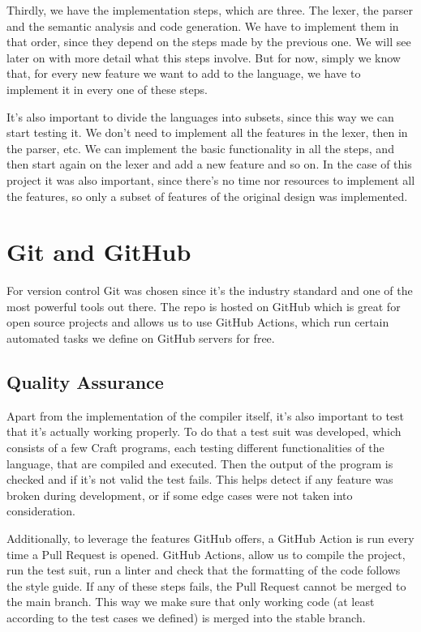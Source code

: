 ﻿\documentclass[10pt,a4paper,twocolumn,twoside]{article}
\begin{document}
Thirdly, we have the implementation steps, which are three. The lexer, the
parser and the semantic analysis and code generation. We have to implement them
in that order, since they depend on the steps made by the previous one.  We will
see later on with more detail what this steps involve. But for now, simply we
know that, for every new feature we want to add to the language, we have to
implement it in every one of these steps.

It's also important to divide the languages into subsets, since this way we 
can start testing it. We don't need to implement all the features in the lexer,
then in the parser, etc. We can implement the basic functionality in all the 
steps, and then start again on the lexer and add a new feature and so on. In the
case of this project it was also important, since there's no time nor resources
to implement all the features, so only a subset of features of the original 
design was implemented.

\section{Git and GitHub}
For version control Git was chosen since it's the industry standard and one of
the most powerful tools out there. The repo is hosted on GitHub which is great
for open source projects and allows us to use GitHub Actions, which run certain
automated tasks we define on GitHub servers for free.

\subsection{Quality Assurance}
Apart from the implementation of the compiler itself, it's also important to 
test that it's actually working properly. To do that a test suit was developed,
which consists of a few Craft programs, each testing different functionalities 
of the language, that are compiled and executed. Then the output of the program 
is checked and if it's not valid the test fails. This helps detect if any 
feature was broken during development, or if some edge cases were not taken into
consideration.

Additionally, to leverage the features GitHub offers, a GitHub Action is run 
every time a Pull Request is opened. GitHub Actions, allow us to compile the 
project, run the test suit, run a linter and check that the formatting of the 
code follows the style guide. If any of these steps fails, the Pull Request
cannot be merged to the main branch. This way we make sure that only working 
code (at least according to the test cases we defined) is merged into the stable 
branch.
\end{document}
